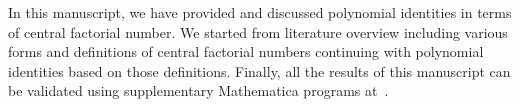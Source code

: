 In this manuscript, we have provided and discussed polynomial identities in terms of central factorial number.
We started from literature overview including various forms and definitions of central factorial numbers
continuing with polynomial identities based on those definitions.
Finally,
all the results of this manuscript can be validated using supplementary
Mathematica programs at~\cite{kolosov2023polynomial}.